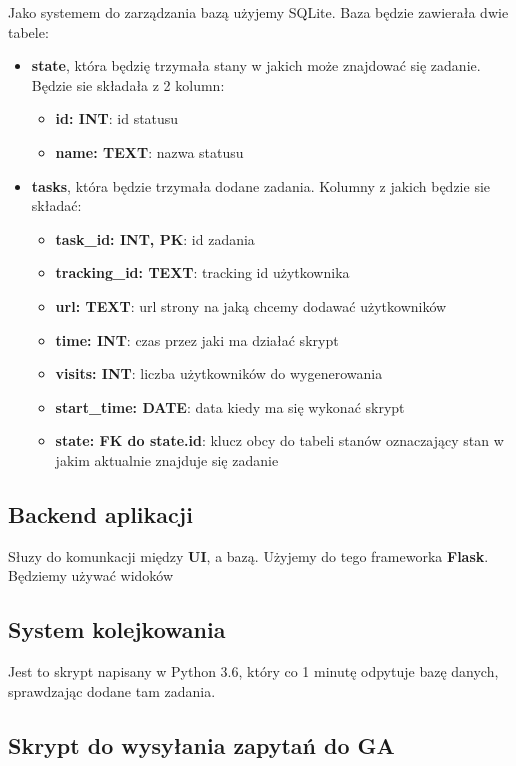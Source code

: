\documentclass{article}
\begin{document}
Jako systemem do zarządzania bazą użyjemy SQLite. Baza będzie zawierała dwie tabele:
\begin{itemize}
\item \textbf{state}, która będzię trzymała stany w jakich może znajdować się zadanie. Będzie sie składała z 2 kolumn:
\begin{itemize}
\item \textbf{id: INT}: id statusu
\item \textbf{name: TEXT}: nazwa statusu
\end{itemize}
\item \textbf{tasks}, która będzie trzymała dodane zadania. Kolumny z jakich będzie sie składać:
\begin{itemize}
\item \textbf{task\_id: INT, PK}: id zadania
\item \textbf{tracking\_id: TEXT}: tracking id użytkownika
\item \textbf{url: TEXT}: url strony na jaką chcemy dodawać użytkowników
\item \textbf{time: INT}: czas przez jaki ma działać skrypt
\item \textbf{visits: INT}: liczba użytkowników do wygenerowania
\item \textbf{start\_time: DATE}: data kiedy ma się wykonać skrypt
\item \textbf{state: FK do state.id}: klucz obcy do tabeli stanów oznaczający stan w jakim aktualnie znajduje się zadanie
\end{itemize}
\end{itemize} 

\subsection{Backend aplikacji}
Słuzy do komunkacji między \textbf{UI}, a bazą. Użyjemy do tego frameworka \textbf{Flask}. Będziemy używać widoków

\subsection{System kolejkowania}
Jest to skrypt napisany w Python 3.6, który co 1 minutę odpytuje bazę danych, sprawdzając dodane tam zadania.

\subsection{Skrypt do wysyłania zapytań do GA}
\end{document}
